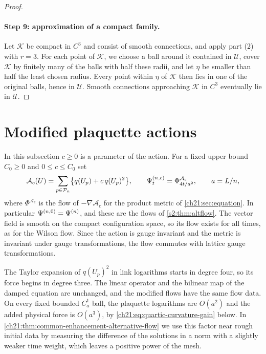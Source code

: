 \begin{proof}
\paragraph{Step 9: approximation of a compact family.}
Let $\mathscr K$ be compact in $C^3$ and consist of smooth connections, and apply part (2) with $r=3$. For each point of $\mathscr K$, we choose a ball around it contained in $\mathscr U$, cover $\mathscr K$ by finitely many of the balls with half these radii, and let $\eta$ be smaller than half the least chosen radius. Every point within $\eta$ of $\mathscr K$ then lies in one of the original balls, hence in $\mathscr U$. Smooth connections approaching $\mathscr K$ in $C^3$ eventually lie in $\mathscr U$.
\end{proof}

\section{Modified plaquette actions}\label{ch21:sec:modified}

In this subsection $c\ge0$ is a parameter of the action. For a fixed upper bound $C_0\ge0$ and $0\le c\le C_0$ set
\[
 \mathcal A_c(U)=\sum_{p\in\mathcal P_{n}}\bigl\{q(U_p)+c\,q(U_p)^2\bigr\},\qquad
 \Psi^{(n,c)}_t=\Phi^{\mathcal A_c}_{4t/a^2},\qquad a=L/n,
\]
where $\Phi^{\mathcal A_c}$ is the flow of $-\nabla\mathcal A_c$ for the product metric of \cref{ch21:sec:equation}. In particular $\Psi^{(n,0)}=\Psi^{(n)}$, and these are the flows of \cref{s2:thm:altflow}. The vector field is smooth on the compact configuration space, so its flow exists for all times, as for the Wilson flow. Since the action is gauge invariant and the metric is invariant under gauge transformations, the flow commutes with lattice gauge transformations.

The Taylor expansion of $q(U_p)^2$ in link logarithms starts in degree four, so its force begins in degree three. The linear operator and the bilinear map of the damped equation are unchanged, and the modified flows have the same flow data. On every fixed bounded $C_a^1$ ball, the plaquette logarithms are $O(a^2)$ and the added physical force is $O(a^3)$, by \eqref{ch21:eq:quartic-curvature-gain} below. In \cref{ch21:thm:common-enhancement-alternative-flow} we use this factor near rough initial data by measuring the difference of the solutions in a norm with a slightly weaker time weight, which leaves a positive power of the mesh.

